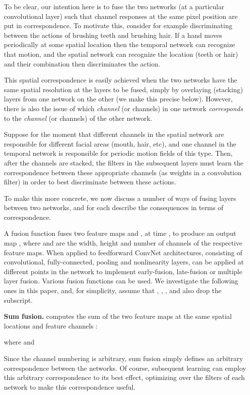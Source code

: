 \documentclass[10pt,twocolumn,letterpaper]{article}
\begin{document}
To be clear, our intention here is to fuse the two networks (at a
particular convolutional layer) such that channel responses at the
same pixel position are put in correspondence. To motivate this, consider
for example 
discriminating between the actions of brushing teeth and brushing hair.
If a hand
moves periodically 
at some spatial location then the temporal network can recognize
that motion, and the spatial network can recognize the location (teeth or hair)
and their combination then discriminates the action.

This spatial correspondence is easily achieved when the two networks
have the same spatial resolution at the layers to be fused, simply by
overlaying (stacking) layers from one network on the other (we make
this precise below).  However, there is also the issue of which {\em
	channel} (or channels) in one network {\em corresponds} to the {\em
	channel} (or channels) of the other network.

Suppose for the moment that different channels in the spatial network
are responsible for different facial areas (mouth, hair, etc), and one
channel in the temporal network is responsible for periodic motion
fields of this type. Then, after the channels are stacked, the filters
in the subsequent layers must learn the correspondence between these
appropriate channels (\eg as weights in a convolution filter) in order
to best discriminate between these actions.

To make this more concrete, we now discuss a number of ways of fusing layers
between two networks, and for each describe the consequences in terms of
correspondence.

A fusion function  fuses two
feature maps  and , 
at time , to produce an
output map , where
 and  are the width, height and number of channels of the
respective feature maps. When applied to feedforward ConvNet
architectures, consisting of convolutional, fully-connected, pooling
and nonlinearity layers,  can be applied at different points in the
network to implement \eg early-fusion, late-fusion or multiple
layer fusion. Various fusion functions  can be used. We investigate the
following ones in this paper, and,
for simplicity, assume that , ,
, and also drop the  subscript.

\textbf{Sum fusion.}  computes the sum of the two feature maps at the same spatial locations  and feature channels : 

where  and 

Since the channel numbering is arbitrary, sum fusion simply defines an
arbitrary correspondence between the networks. Of course, subsequent learning
can employ this arbitrary correspondence to its best effect,
optimizing over the filters of each network to make this correspondence
useful.
\end{document}
